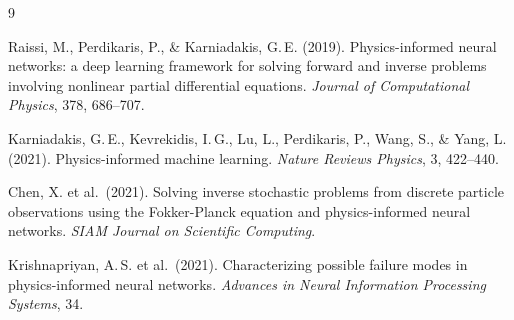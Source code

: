 \documentclass[12pt,a4paper]{article}
\begin{document}

\begin{thebibliography}{9}

Raissi, M., Perdikaris, P., \& Karniadakis, G.\,E. (2019).
Physics-informed neural networks: a deep learning framework for solving forward and
inverse problems involving nonlinear partial differential equations.
\textit{Journal of Computational Physics}, 378, 686--707.

Karniadakis, G.\,E., Kevrekidis, I.\,G., Lu, L., Perdikaris, P., Wang, S., \& Yang, L.
(2021). Physics-informed machine learning.
\textit{Nature Reviews Physics}, 3, 422--440.

Chen, X. et al.\ (2021). Solving inverse stochastic problems from discrete particle
observations using the Fokker-Planck equation and physics-informed neural networks.
\textit{SIAM Journal on Scientific Computing}.

Krishnapriyan, A.\,S. et al.\ (2021). Characterizing possible failure modes in
physics-informed neural networks.
\textit{Advances in Neural Information Processing Systems}, 34.

\end{thebibliography}
\end{document}
